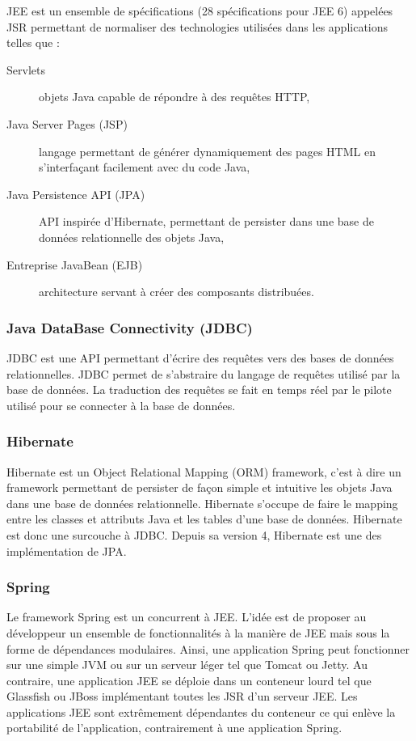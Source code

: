 JEE \cite{jee} est un ensemble de spécifications (28 spécifications pour JEE 6) appelées JSR permettant de normaliser des technologies utilisées dans les applications telles que :

\begin{description}
	\item[Servlets] objets Java capable de répondre à des requêtes HTTP,
	\item[Java Server Pages (JSP)] langage permettant de générer dynamiquement des pages HTML en s'interfaçant facilement avec du code Java,
	\item[Java Persistence API (JPA)] API inspirée d'Hibernate, permettant de persister dans une base de données relationnelle des objets Java,
	\item[Entreprise JavaBean (EJB)] architecture servant à créer des composants distribuées.
\end{description}

\subsubsection{Java DataBase Connectivity (JDBC)}

JDBC \cite{jdbc} est une API permettant d'écrire des requêtes vers des bases de données relationnelles. JDBC permet de s'abstraire du langage de requêtes utilisé par la base de données. La traduction des requêtes se fait en temps réel par le pilote utilisé pour se connecter à la base de données.

\subsubsection{Hibernate}

Hibernate \cite{hibernate} est un Object Relational Mapping (ORM) framework, c'est à dire un framework permettant de persister de façon simple et intuitive les objets Java dans une base de données relationnelle. Hibernate s'occupe de faire le mapping entre les classes et attributs Java et les tables d'une base de données. Hibernate est donc une surcouche à JDBC. Depuis sa version 4, Hibernate est une des implémentation de JPA.

\subsubsection{Spring}

Le framework Spring \cite{sprint} est un concurrent à JEE. L'idée est de proposer au développeur un ensemble de fonctionnalités à la manière de JEE mais sous la forme de dépendances modulaires. Ainsi, une application Spring peut fonctionner sur une simple JVM ou sur un serveur léger tel que Tomcat ou Jetty. Au contraire, une application JEE se déploie dans un conteneur lourd tel que Glassfish ou JBoss implémentant toutes les JSR d'un serveur JEE. Les applications JEE sont extrêmement dépendantes du conteneur ce qui enlève la portabilité de l'application, contrairement à une application Spring.\\

